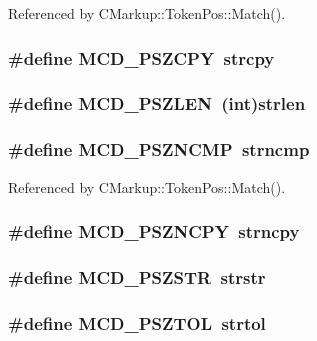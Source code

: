 Referenced by CMarkup::TokenPos::Match().
\subsubsection[MCD\_\-PSZCPY]{\setlength{\rightskip}{0pt plus 5cm}\#define MCD\_\-PSZCPY~strcpy}\label{Markup_8h_ff4771eb9cee750223aa117b8cafdab6}


\subsubsection[MCD\_\-PSZLEN]{\setlength{\rightskip}{0pt plus 5cm}\#define MCD\_\-PSZLEN~(int)strlen}\label{Markup_8h_f8601b14e21b7fe9a4b55953ddbb75c2}


\subsubsection[MCD\_\-PSZNCMP]{\setlength{\rightskip}{0pt plus 5cm}\#define MCD\_\-PSZNCMP~strncmp}\label{Markup_8h_4e2907b0d2098130db8cffd774afef88}




Referenced by CMarkup::TokenPos::Match().
\subsubsection[MCD\_\-PSZNCPY]{\setlength{\rightskip}{0pt plus 5cm}\#define MCD\_\-PSZNCPY~strncpy}\label{Markup_8h_6abfcd289e88bf2cd4a7e26abf231551}


\subsubsection[MCD\_\-PSZSTR]{\setlength{\rightskip}{0pt plus 5cm}\#define MCD\_\-PSZSTR~strstr}\label{Markup_8h_d63af44417f9dcdb5ee845a08cbd19d2}


\subsubsection[MCD\_\-PSZTOL]{\setlength{\rightskip}{0pt plus 5cm}\#define MCD\_\-PSZTOL~strtol}\label{Markup_8h_0f9f184175207bff11e204540c56b473}


